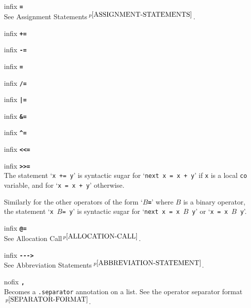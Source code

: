 \documentclass[12pt]{article}
\newcommand{\TT}[1]{{\tt \bfseries #1}}
\newcommand{\pagnote}[1]{$\,^{p\pageref{#1}}$}
\newenvironment{itemlist}[1][1.2in]%
	{\begin{list}{}{\setlength{\labelwidth}{#1}%
		        \setlength{\leftmargin}{\labelwidth}%
		        \addtolength{\leftmargin}{+0.2in}%
		        \renewcommand{\makelabel}[1]{##1\hfill}}}%
	{\end{list}}
\begin{document}
\begin{itemlist}[0.2in]
\item[infix \TT{=}] ~\\
See Assignment Statements\pagnote{ASSIGNMENT-STATEMENTS}.

\item[infix \TT{+=}]
\item[infix \TT{-=}] \vspace*{-0.15in}
\item[infix \TT{*=}] \vspace*{-0.15in}
\item[infix \TT{/=}] \vspace*{-0.15in}
\item[infix \TT{|=}] \vspace*{-0.15in}
\item[infix \TT{\&=}] \vspace*{-0.15in}
\item[infix \TT{\textasciicircum=}] \vspace*{-0.15in}
\item[infix \TT{<{}<{}=}] \vspace*{-0.15in}
\item[infix \TT{>{}>{}=}] \vspace*{-0.15in} ~\\
The statement `{\tt x += y}' is syntactic sugar for `{\tt next x = x + y}'
if {\tt x} is a local {\tt co} variable, and for
`{\tt x = x + y}' otherwise.

Similarly for the other operators of the form `\TT{$B$=}'
where $B$ is a binary operator,
the statement `{\tt x $B$= y}' is syntactic sugar for
`{\tt next x = x $B$ y}' or `{\tt x = x $B$ y}'.

\item[infix \TT{@=}] ~\\
See Allocation Call\pagnote{ALLOCATION-CALL}.

\item[infix \TT{-{}-{}-{}>}] ~\\
See Abbreviation Statements\pagnote{ABBREVIATION-STATEMENT}.

\item[nofix \TT{,}] ~\\
Becomes a {\tt .separator} annotation on a list.  See
the operator separator format\pagnote{SEPARATOR-FORMAT}.


\end{itemlist}
\end{document}
